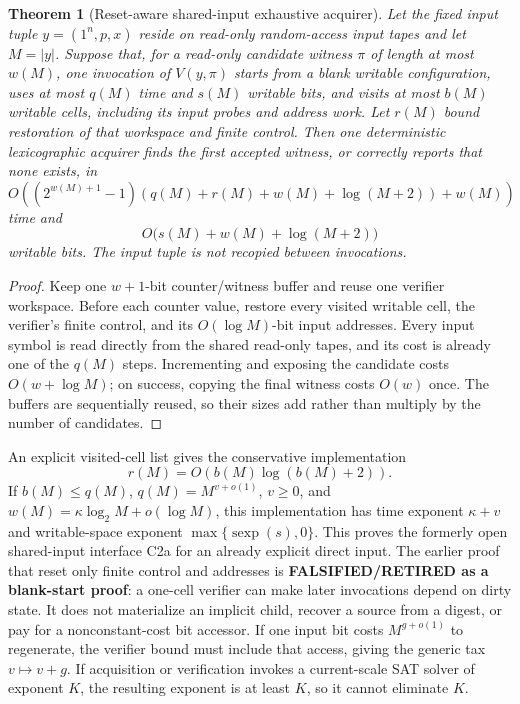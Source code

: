 \documentclass[11pt]{article}
\newtheorem{theorem}{Theorem}
\begin{document}
\begin{theorem}[Reset-aware shared-input exhaustive acquirer]
Let the fixed input tuple \(y=(1^n,p,x)\) reside on read-only random-access
input tapes and let \(M=|y|\).  Suppose that, for a read-only candidate
witness \(\pi\) of length at most \(w(M)\), one invocation of \(V(y,\pi)\)
starts from a blank writable configuration, uses at most \(q(M)\) time and
\(s(M)\) writable bits, and visits at most \(b(M)\) writable cells, including
its input probes and address work.  Let \(r(M)\) bound restoration of that
workspace and finite control.  Then one deterministic lexicographic acquirer
finds the first accepted witness, or correctly reports that none exists, in
\[
 O\!\left((2^{w(M)+1}-1)
       (q(M)+r(M)+w(M)+\log(M+2))+w(M)\right)
\]
time and
\[
 O\bigl(s(M)+w(M)+\log(M+2)\bigr)
\]
writable bits.  The input tuple is not recopied between invocations.
\end{theorem}
\begin{proof}
Keep one \(w+1\)-bit counter/witness buffer and reuse one verifier workspace.
Before each counter value, restore every visited writable cell, the verifier's
finite control, and its \(O(\log M)\)-bit input addresses.  Every input symbol is read directly from
the shared read-only tapes, and its cost is already one of the \(q(M)\)
steps.  Incrementing and exposing the candidate costs \(O(w+\log M)\);
on success, copying the final witness costs \(O(w)\) once.  The buffers are
sequentially reused, so their sizes add rather than multiply by the number
of candidates.
\end{proof}
An explicit visited-cell list gives the conservative implementation
\[
 r(M)=O\!\left(b(M)\log(b(M)+2)\right).
\]
If \(b(M)\le q(M)\), \(q(M)=M^{v+o(1)}\), \(v\ge0\), and
\(w(M)=\kappa\log_2M+o(\log M)\), this implementation has time exponent
\(\kappa+v\) and writable-space exponent
\(\max\{\operatorname{sexp}(s),0\}\).  This proves the formerly open
shared-input interface C2a for an already explicit direct input.  The earlier
proof that reset only finite control and addresses is
\textbf{FALSIFIED/RETIRED as a blank-start proof}: a one-cell verifier can
make later invocations depend on dirty state.  It does not
materialize an implicit child, recover a source from a digest, or pay for a
nonconstant-cost bit accessor.  If one input bit costs \(M^{g+o(1)}\) to
regenerate, the verifier bound must include that access, giving the generic
tax \(v\mapsto v+g\).  If acquisition or verification invokes a current-scale
SAT solver of exponent \(K\), the resulting exponent is at least \(K\), so it
cannot eliminate \(K\).
\end{document}
